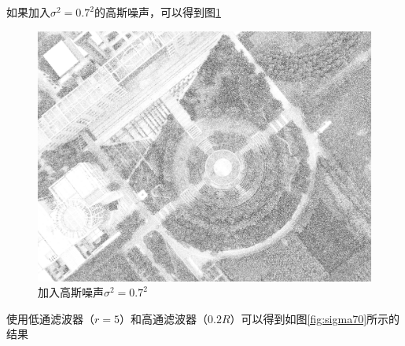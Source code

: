 如果加入$\sigma^2=0.7^2$的高斯噪声，可以得到图\ref{fig:dji0027withnoise70}
\begin{figure}[H]
	\centering
	\includegraphics[width=0.7\linewidth]{figure/DJI_0027_With_Noise_70}
	\caption{加入高斯噪声$\sigma^2=0.7^2$}
	\label{fig:dji0027withnoise70}
\end{figure}
使用低通滤波器（$r=5$）和高通滤波器（$0.2R$）可以得到如图\ref{fig:sigma70}所示的结果
